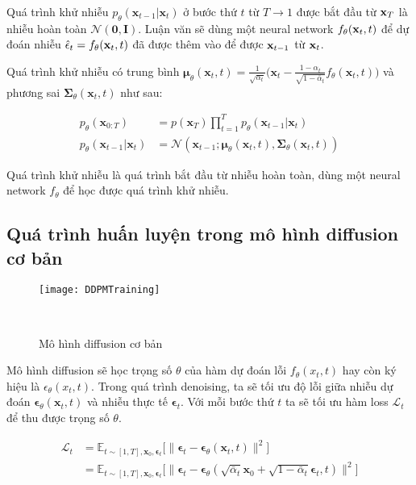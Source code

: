 Quá trình khử nhiễu $p_\theta(\mathbf{x}_{t-1} \vert \mathbf{x}_t)$  ở bước thứ $t$ từ $T \to 1$ được bắt đầu từ $\mathbf{x}_T$ là nhiễu hoàn toàn $\mathcal{N} (\mathbf{0}, \mathbf{I})$. Luận văn sẽ dùng một neural network $f_{\theta} (\mathbf{x}_t, t)$ để dự đoán nhiễu $\hat{\epsilon}_t = f_{\theta}(\mathbf{x}_t, t)$ đã được thêm vào để được $\mathbf{x}_{t-1}$ từ $\mathbf{x}_t$.

Quá trình khử nhiễu có trung bình $\boldsymbol{\mu}_\theta(\mathbf{x}_t, t) = {\frac{1}{\sqrt{\alpha_t}} \Big( \mathbf{x}_t - \frac{1 - \alpha_t}{\sqrt{1 - \bar{\alpha}_t}}  f_\theta(\mathbf{x}_t, t) \Big)}$ và phương sai $\boldsymbol{\Sigma}_\theta(\mathbf{x}_t, t)$ như sau:

\begin{equation}
	\label{eq:denoising_process}
	\begin{aligned}
		p_\theta(\mathbf{x}_{0:T})
		&= p(\mathbf{x}_T) \prod^T_{t=1} p_\theta(\mathbf{x}_{t-1} \vert \mathbf{x}_t) \\
		p_\theta(\mathbf{x}_{t-1} \vert \mathbf{x}_t) &= \mathcal{N}(\mathbf{x}_{t-1};  \boldsymbol{\mu}_\theta(\mathbf{x}_t, t), \boldsymbol{\Sigma}_\theta(\mathbf{x}_t, t))
	\end{aligned}
\end{equation}

Quá trình khử nhiễu là quá trình bắt đầu từ nhiễu hoàn toàn, dùng một neural network $f_\theta$ để học được quá trình khử nhiễu.


\subsection{Quá trình huấn luyện trong mô hình diffusion cơ bản}
	
	\begin{figure}[H]
		\centering
		\texttt{[image: DDPMTraining]}
		\caption{Mô hình diffusion cơ bản}
		\label{fig:basic_diffusion}\
		\vspace{-5pt}
	\end{figure}
	
	Mô hình diffusion sẽ học trọng số $\theta$ của hàm dự đoán lỗi $f_{\theta} (x_t, t)$ hay còn ký hiệu là  $\epsilon_{\theta} (x_t, t)$. Trong quá trình denoising, ta sẽ tối ưu độ lỗi giữa nhiễu dự đoán $\boldsymbol{\epsilon}_\theta(\mathbf{x}_t, t)$ và nhiễu thực tế $\boldsymbol{\epsilon}_t$. Với mỗi bước thứ $t$ ta sẽ tối ưu hàm loss $\mathcal{L}_{t}$ để thu được trọng số $\theta$.
	
	\begin{equation}
		\label{eq:diffusion_loss}
		\begin{aligned}
			\mathcal{L}_t
			&= \mathbb{E}_{t \sim [1, T], \mathbf{x}_0, \boldsymbol{\epsilon}_t} \Big[\|\boldsymbol{\epsilon}_t - \boldsymbol{\epsilon}_\theta(\mathbf{x}_t, t)\|^2 \Big] \\
			&= \mathbb{E}_{t \sim [1, T], \mathbf{x}_0, \boldsymbol{\epsilon}_t} \Big[\|\boldsymbol{\epsilon}_t - \boldsymbol{\epsilon}_\theta(\sqrt{\bar{\alpha}_t}\mathbf{x}_0 + \sqrt{1 - \bar{\alpha}_t}\boldsymbol{\epsilon}_t, t)\|^2 \Big]
		\end{aligned}
	\end{equation}


